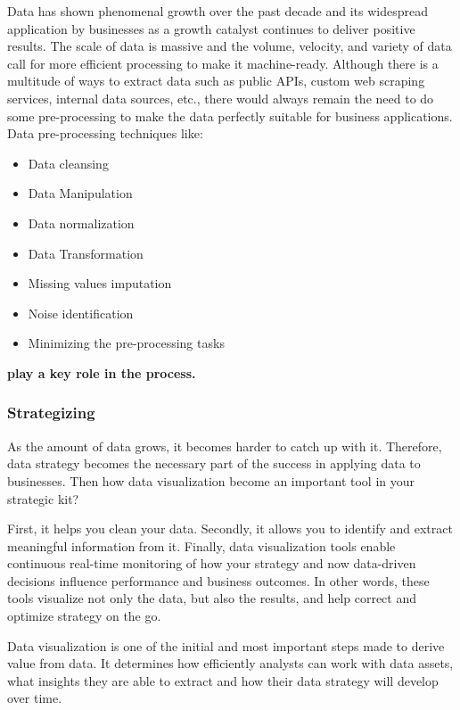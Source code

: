 \documentclass[]{book}
\providecommand{\tightlist}{%
  \setlength{\itemsep}{0pt}\setlength{\parskip}{0pt}}
\theoremstyle{definition}
\theoremstyle{definition}
\theoremstyle{definition}
\theoremstyle{remark}
\begin{document}
Data has shown phenomenal growth over the past decade and its widespread
application by businesses as a growth catalyst continues to deliver
positive results. The scale of data is massive and the volume, velocity,
and variety of data call for more efficient processing to make it
machine-ready. Although there is a multitude of ways to extract data
such as public APIs, custom web scraping services, internal data
sources, etc., there would always remain the need to do some
pre-processing to make the data perfectly suitable for business
applications. Data pre-processing techniques like:

\begin{itemize}
\tightlist
\item
  Data cleansing
\item
  Data Manipulation
\item
  Data normalization
\item
  Data Transformation
\item
  Missing values imputation
\item
  Noise identification
\item
  Minimizing the pre-processing tasks
\end{itemize}

\textbf{play a key role in the process.}

\subsubsection{Strategizing}\label{strategizing}

As the amount of data grows, it becomes harder to catch up with it.
Therefore, data strategy becomes the necessary part of the success in
applying data to businesses. Then how data visualization become an
important tool in your strategic kit?

First, it helps you clean your data. Secondly, it allows you to identify
and extract meaningful information from it. Finally, data visualization
tools enable continuous real-time monitoring of how your strategy and
now data-driven decisions influence performance and business outcomes.
In other words, these tools visualize not only the data, but also the
results, and help correct and optimize strategy on the go.

Data visualization is one of the initial and most important steps made
to derive value from data. It determines how efficiently analysts can
work with data assets, what insights they are able to extract and how
their data strategy will develop over time.
\end{document}

